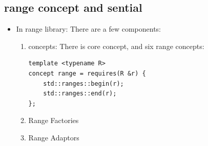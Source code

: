 \documentclass[a4paper,11pt,twoside]{book}
\begin{document}
\subsection{range concept and sential}
\begin{itemize}
\item In range library: There are a few components:
\begin{enumerate}
		\item concepts: There is core concept, and six range concepts:

\begin{lstlisting}
template <typename R>
concept range = requires(R &r) {
    std::ranges::begin(r);
    std::ranges::end(r);
};
\end{lstlisting}

		\item Range Factories 
		\item Range Adaptors

\end{enumerate}
\end{itemize}
\end{document}
